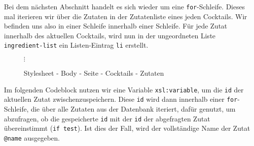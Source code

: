 Bei dem nächsten Abschnitt handelt es sich wieder um eine \texttt{for}-Schleife. Dieses mal iterieren wir über die Zutaten in der Zutatenliste eines jeden Cocktails. Wir befinden uns also in einer Schleife innerhalb einer Schleife. Für jede Zutat innerhalb des aktuellen Cocktails, wird nun in der ungeordneten Liste \texttt{ingredient-list} ein Listen-Eintrag \texttt{li} erstellt.

\renewcommand{\thefigure}{2.19}
\begin{figure}[H]
\label{code:stylesheet-body-site-cocktails-for-each}



$\vdots$



\caption{Stylesheet - Body - Seite - Cocktails - Zutaten}
\end{figure}

\begin{figure}[ht]\centering\resizebox{!}{0cm}{\begin{minipage}{\textwidth}\end{minipage}}\end{figure}
\vspace*{-1.2cm}







Im folgenden Codeblock nutzen wir eine Variable \texttt{xsl:variable}, um die \texttt{id} der aktuellen Zutat zwischenzuspeichern. Diese \texttt{id} wird dann innerhalb einer \texttt{for}-Schleife, die über alle Zutaten aus der Datenbank iteriert, dafür genutzt, um abzufragen, ob die gespeicherte \texttt{id} mit der \texttt{id} der abgefragten Zutat übereinstimmt (\texttt{if test}). Ist dies der Fall, wird der vollständige Name der Zutat \texttt{@name} ausgegeben.







